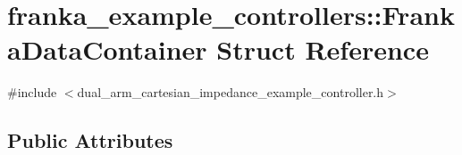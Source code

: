 \hypertarget{structfranka__example__controllers_1_1_franka_data_container}{}\section{franka\+\_\+example\+\_\+controllers\+:\+:Franka\+Data\+Container Struct Reference}
\label{structfranka__example__controllers_1_1_franka_data_container}


{\ttfamily \#include $<$dual\+\_\+arm\+\_\+cartesian\+\_\+impedance\+\_\+example\+\_\+controller.\+h$>$}

\subsection*{Public Attributes}
